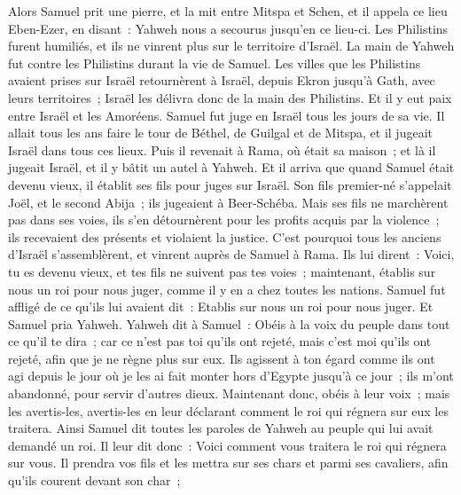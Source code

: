 \begin{multicols}{2}
Alors Samuel prit une pierre, et la mit entre Mitspa et Schen, et il appela ce lieu Eben-Ezer, en disant~: Yahweh nous a secourus jusqu'en ce lieu-ci.
Les Philistins furent humiliés, et ils ne vinrent plus sur le territoire d'Israël. La main de Yahweh fut contre les Philistins durant la vie de Samuel.
Les villes que les Philistins avaient prises sur Israël retournèrent à Israël, depuis Ekron jusqu'à Gath, avec leurs territoires~; Israël les délivra donc de la main des Philistins. Et il y eut paix entre Israël et les Amoréens.
Samuel fut juge en Israël tous les jours de sa vie.
Il allait tous les ans faire le tour de Béthel, de Guilgal et de Mitspa, et il jugeait Israël dans tous ces lieux.
Puis il revenait à Rama, où était sa maison~; et là il jugeait Israël, et il y bâtit un autel à Yahweh.
\VerseOne{}Et il arriva que quand Samuel était devenu vieux, il établit ses fils pour juges sur Israël.
Son fils premier-né s'appelait Joël, et le second Abija~; ils jugeaient à Beer-Schéba.
Mais ses fils ne marchèrent pas dans ses voies, ils s'en détournèrent pour les profits acquis par la violence~; ils recevaient des présents et violaient la justice.
C'est pourquoi tous les anciens d'Israël s'assemblèrent, et vinrent auprès de Samuel à Rama.
Ils lui dirent~: Voici, tu es devenu vieux, et tes fils ne suivent pas tes voies~; maintenant, établis sur nous un roi pour nous juger, comme il y en a chez toutes les nations.
Samuel fut affligé de ce qu'ils lui avaient dit~: Etablis sur nous un roi pour nous juger. Et Samuel pria Yahweh.
Yahweh dit à Samuel~: Obéis à la voix du peuple dans tout ce qu'il te dira~; car ce n'est pas toi qu'ils ont rejeté, mais c'est moi qu'ils ont rejeté, afin que je ne règne plus sur eux.
Ils agissent à ton égard comme ils ont agi depuis le jour où je les ai fait monter hors d'Egypte jusqu'à ce jour~; ils m'ont abandonné, pour servir d'autres dieux.
Maintenant donc, obéis à leur voix~; mais les avertis-les, avertis-les en leur déclarant comment le roi qui régnera sur eux les traitera.
Ainsi Samuel dit toutes les paroles de Yahweh au peuple qui lui avait demandé un roi.
Il leur dit donc~: Voici comment vous traitera le roi qui régnera sur vous. Il prendra vos fils et les mettra sur ses chars et parmi ses cavaliers, afin qu'ils courent devant son char~;

\end{multicols}

